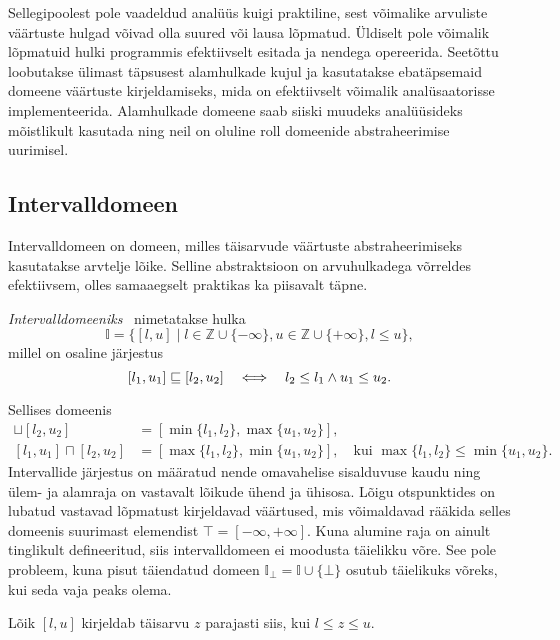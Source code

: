 \documentclass[../thesis.tex]{subfiles}
\begin{document}
Sellegipoolest pole vaadeldud analüüs kuigi praktiline, sest võimalike arvuliste väärtuste hulgad võivad olla suured või lausa lõpmatud. Üldiselt pole võimalik lõpmatuid hulki programmis efektiivselt esitada ja nendega opereerida. Seetõttu loobutakse ülimast täpsusest alamhulkade kujul ja kasutatakse ebatäpsemaid domeene väärtuste kirjeldamiseks, mida on efektiivselt võimalik analüsaatorisse implementeerida.
Alamhulkade domeene saab siiski muudeks analüüsideks mõistlikult kasutada ning neil on oluline roll domeenide abstraheerimise uurimisel.


\subsection{Intervalldomeen}
Intervalldomeen on domeen, milles täisarvude väärtuste abstraheerimiseks kasutatakse arvtelje lõike. Selline abstraktsioon on arvuhulkadega võrreldes efektiivsem, olles samaaegselt praktikas ka piisavalt täpne.

\begin{definition}
\emph{Intervalldomeeniks}~\cite[55]{seidl_foundations} nimetatakse hulka
\[
	\mathbb{I} = \{ [l, u] \mid l \in \mathbb{Z} \cup \{-\infty\}, u \in \mathbb{Z} \cup \{+\infty\}, l \leq u \},
\]
millel on osaline järjestus
\[
	[l_1, u_1] \sqsubseteq [l_2, u_2] \quad\Longleftrightarrow\quad l_2 \leq l_1 \land u_1 \leq u_2.
\]
\end{definition}

Sellises domeenis
\begin{align*}
	[l_1, u_1] \sqcup [l_2, u_2] &= [\min\{l_1, l_2\}, \max\{u_1, u_2\}], \\
	[l_1, u_1] \sqcap [l_2, u_2] &= [\max\{l_1, l_2\}, \min\{u_1, u_2\}],\quad \text{kui } \max\{l_1, l_2\} \leq \min\{u_1, u_2\}.
\end{align*}
Intervallide järjestus on määratud nende omavahelise sisalduvuse kaudu ning ülem- ja alamraja on vastavalt lõikude ühend ja ühisosa.
Lõigu otspunktides on lubatud vastavad lõpmatust kirjeldavad väärtused, mis võimaldavad rääkida selles domeenis suurimast elemendist $\top = [-\infty, +\infty]$.
Kuna alumine raja on ainult tinglikult defineeritud, siis intervalldomeen ei moodusta täielikku võre. See pole probleem, kuna pisut täiendatud domeen $\mathbb{I}_\bot = \mathbb{I} \cup \{\bot\}$ osutub täielikuks võreks, kui seda vaja peaks olema.

Lõik $[l, u]$ kirjeldab täisarvu $z$ parajasti siis, kui $l \leq z \leq u$.
\end{document}
